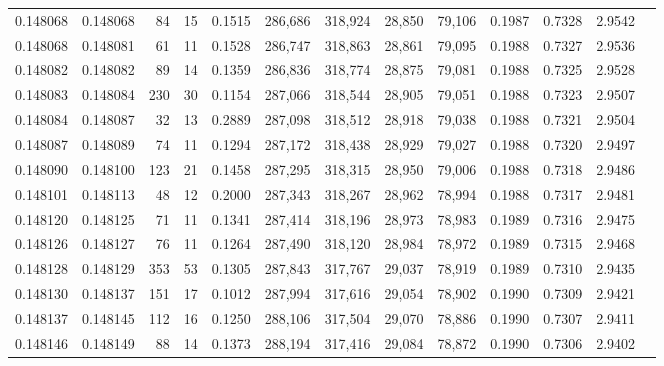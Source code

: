 \begin{tabular}{rrrrrrrrrrrrr}
0.148068 & 0.148068 &    84 &  15 &                                     0.1515 & 286,686 & 318,924 &  28,850 &  79,106 & 0.1987 & 0.7328 & 2.9542 \\
0.148068 & 0.148081 &    61 &  11 &                                     0.1528 & 286,747 & 318,863 &  28,861 &  79,095 & 0.1988 & 0.7327 & 2.9536 \\
0.148082 & 0.148082 &    89 &  14 &                                     0.1359 & 286,836 & 318,774 &  28,875 &  79,081 & 0.1988 & 0.7325 & 2.9528 \\
0.148083 & 0.148084 &   230 &  30 &                                     0.1154 & 287,066 & 318,544 &  28,905 &  79,051 & 0.1988 & 0.7323 & 2.9507 \\
0.148084 & 0.148087 &    32 &  13 &                                     0.2889 & 287,098 & 318,512 &  28,918 &  79,038 & 0.1988 & 0.7321 & 2.9504 \\
0.148087 & 0.148089 &    74 &  11 &                                     0.1294 & 287,172 & 318,438 &  28,929 &  79,027 & 0.1988 & 0.7320 & 2.9497 \\
0.148090 & 0.148100 &   123 &  21 &                                     0.1458 & 287,295 & 318,315 &  28,950 &  79,006 & 0.1988 & 0.7318 & 2.9486 \\
0.148101 & 0.148113 &    48 &  12 &                                     0.2000 & 287,343 & 318,267 &  28,962 &  78,994 & 0.1988 & 0.7317 & 2.9481 \\
0.148120 & 0.148125 &    71 &  11 &                                     0.1341 & 287,414 & 318,196 &  28,973 &  78,983 & 0.1989 & 0.7316 & 2.9475 \\
0.148126 & 0.148127 &    76 &  11 &                                     0.1264 & 287,490 & 318,120 &  28,984 &  78,972 & 0.1989 & 0.7315 & 2.9468 \\
0.148128 & 0.148129 &   353 &  53 &                                     0.1305 & 287,843 & 317,767 &  29,037 &  78,919 & 0.1989 & 0.7310 & 2.9435 \\
0.148130 & 0.148137 &   151 &  17 &                                     0.1012 & 287,994 & 317,616 &  29,054 &  78,902 & 0.1990 & 0.7309 & 2.9421 \\
0.148137 & 0.148145 &   112 &  16 &                                     0.1250 & 288,106 & 317,504 &  29,070 &  78,886 & 0.1990 & 0.7307 & 2.9411 \\
0.148146 & 0.148149 &    88 &  14 &                                     0.1373 & 288,194 & 317,416 &  29,084 &  78,872 & 0.1990 & 0.7306 & 2.9402 \\

\end{tabular}
